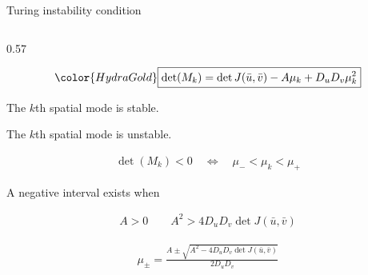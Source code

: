 \begin{frame}{Turing instability condition}

  \vspace{-0.24cm}

  \begin{columns}[c,onlytextwidth]

    \begin{column}{0.57\textwidth}

      \vspace{-0.30cm}

      {\color{HydraWhite}\bfseries\fontsize{10.4}{13.2}\selectfont
      \begin{align*}
        {\color{HydraGold}
          \boxed{
            \det(M_k)
            =
            \det J(\bar u,\bar v)-A\mu_k+D_uD_v\mu_k^2
          }
        }
      \end{align*}
      }

      \vspace{-0.44cm}

        {The $k$th spatial mode is stable.}

      \vspace{-0.0cm}

        {The $k$th spatial mode is unstable.}

      \vspace{-0.3cm}

{\color{HydraWhite}\fontsize{9.5}{12}\selectfont
      \begin{align*}
        \det(M_k)<0
        \quad\Longleftrightarrow\quad
        \mu_-<\mu_k<\mu_+
      \end{align*}
      }

      \vspace{-0.3cm}
      {\color{HydraMuted}\fontsize{7.4}{9.1}\selectfont
        A negative interval exists when
      \par}

      \vspace{-0.62cm}

      {\color{HydraWhite}\fontsize{9.5}{12}\selectfont
      \begin{align*}
        A>0
        \qquad
        A^2>4D_uD_v\det J(\bar u,\bar v)
      \end{align*}
      }

      \vspace{-0.80cm}

      {\color{HydraWhite}\fontsize{8.8}{11.1}\selectfont
      \begin{align*}
        \mu_\pm
        =
        \frac{
          A\pm\sqrt{A^2-4D_uD_v\det J(\bar u,\bar v)}
        }{
          2D_uD_v
        }
      \end{align*}
      }
    \end{column}


\end{columns}
\end{frame}
